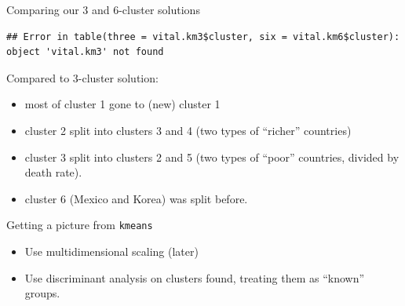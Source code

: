 \documentclass[ignorenonframetext,]{beamer}
\newenvironment{Shaded}{\begin{snugshade}}{\end{snugshade}}
\newcommand{\DataTypeTok}[1]{\textcolor[rgb]{0.13,0.29,0.53}{#1}}
\newcommand{\KeywordTok}[1]{\textcolor[rgb]{0.13,0.29,0.53}{\textbf{#1}}}
\newcommand{\NormalTok}[1]{#1}
\newcommand{\OperatorTok}[1]{\textcolor[rgb]{0.81,0.36,0.00}{\textbf{#1}}}
\begin{document}
\begin{frame}[fragile]{Comparing our 3 and 6-cluster solutions}
\protect\hypertarget{comparing-our-3-and-6-cluster-solutions}{}

\begin{Shaded}
\end{Shaded}

\begin{verbatim}
## Error in table(three = vital.km3$cluster, six = vital.km6$cluster): object 'vital.km3' not found
\end{verbatim}

Compared to 3-cluster solution:

\begin{itemize}
\item
  most of cluster 1 gone to (new) cluster 1
\item
  cluster 2 split into clusters 3 and 4 (two types of ``richer''
  countries)
\item
  cluster 3 split into clusters 2 and 5 (two types of ``poor''
  countries, divided by death rate).
\item
  cluster 6 (Mexico and Korea) was split before.
\end{itemize}

\end{frame}

\begin{frame}{Getting a picture from \texttt{kmeans}}
\protect\hypertarget{getting-a-picture-from-kmeans}{}

\begin{itemize}
\item
  Use multidimensional scaling (later)
\item
  Use discriminant analysis on clusters found, treating them as
  ``known'' groups.
\end{itemize}

\end{frame}
\end{document}
